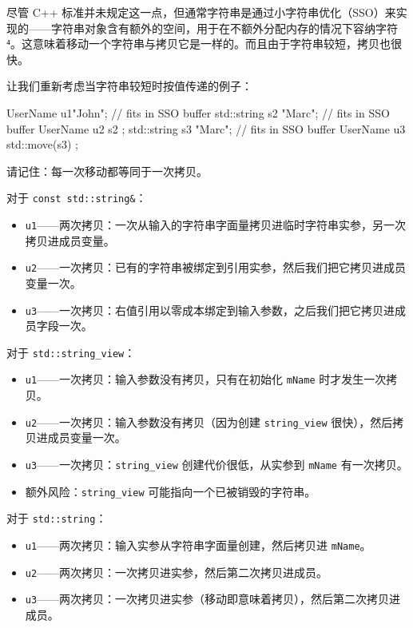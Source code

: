 尽管 C++ 标准并未规定这一点，但通常字符串是通过小字符串优化（SSO）来实现的——字符串对象含有额外的空间，用于在不额外分配内存的情况下容纳字符⁴。这意味着移动一个字符串与拷贝它是一样的。而且由于字符串较短，拷贝也很快。

让我们重新考虑当字符串较短时按值传递的例子：

\begin{codebox}[cpp]
UserName u1{"John"}; // fits in SSO buffer
std::string s2 {"Marc"}; // fits in SSO buffer
UserName u2 { s2 };
std::string s3 {"Marc"}; // fits in SSO buffer
UserName u3 { std::move(s3) };
\end{codebox}

请记住：每一次移动都等同于一次拷贝。

对于 \texttt{const std::string\&}：

\begin{itemize}
\item \texttt{u1}——两次拷贝：一次从输入的字符串字面量拷贝进临时字符串实参，另一次拷贝进成员变量。
\item \texttt{u2}——一次拷贝：已有的字符串被绑定到引用实参，然后我们把它拷贝进成员变量一次。
\item \texttt{u3}——一次拷贝：右值引用以零成本绑定到输入参数，之后我们把它拷贝进成员字段一次。
\end{itemize}

对于 \texttt{std::string\_view}：

\begin{itemize}
\item \texttt{u1}——一次拷贝：输入参数没有拷贝，只有在初始化 \texttt{mName} 时才发生一次拷贝。
\item \texttt{u2}——一次拷贝：输入参数没有拷贝（因为创建 \texttt{string\_view} 很快），然后拷贝进成员变量一次。
\item \texttt{u3}——一次拷贝：\texttt{string\_view} 创建代价很低，从实参到 \texttt{mName} 有一次拷贝。
\item 额外风险：\texttt{string\_view} 可能指向一个已被销毁的字符串。
\end{itemize}

对于 \texttt{std::string}：

\begin{itemize}
\item \texttt{u1}——两次拷贝：输入实参从字符串字面量创建，然后拷贝进 \texttt{mName}。
\item \texttt{u2}——两次拷贝：一次拷贝进实参，然后第二次拷贝进成员。
\item \texttt{u3}——两次拷贝：一次拷贝进实参（移动即意味着拷贝），然后第二次拷贝进成员。
\end{itemize}

